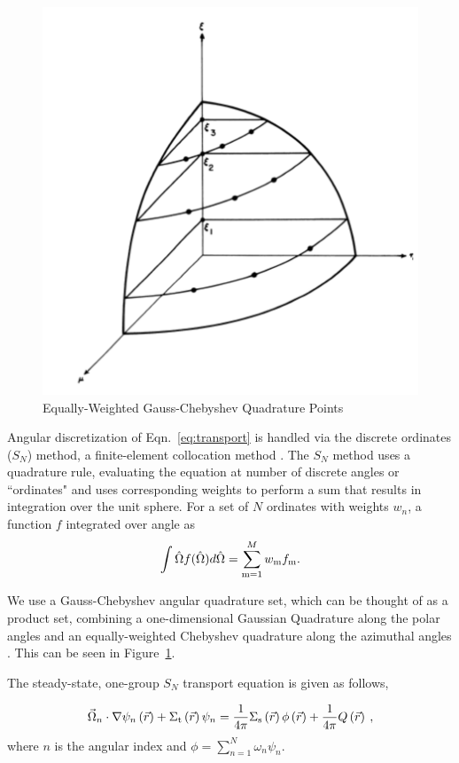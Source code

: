 \begin{figure}[H]
    \centering
    \includegraphics[width=.5\textwidth]{fig/SNPoints.png}
    \caption{Equally-Weighted Gauss-Chebyshev Quadrature Points \cite{Lathrop1965}}
    \label{fig:SN}
\end{figure}
%
Angular discretization of Eqn.~\eqref{eq:transport} is handled via the discrete ordinates ($S_N$) method, a finite-element collocation method \cite{Lathrop1965}. The $S_N$ method uses a quadrature rule, evaluating the equation at number of discrete angles or ``ordinates" and uses corresponding weights to perform a sum that results in integration over the unit sphere. 
For a set of $N$ ordinates with weights $w_n$, a function $f$ integrated over angle as
%
\begin{equation}

\int \hat{\Omega} f(\hat{\Omega}) d \hat{\Omega} = \sum\limits_{\mrm=1}^{M} w_\mrm f_\mrm.    

\end{equation}

We use a Gauss-Chebyshev angular quadrature set, which can be thought of as a product set, combining a one-dimensional Gaussian Quadrature along the polar angles and an equally-weighted Chebyshev quadrature along the azimuthal angles \cite{jarrel-thesis}. This can be seen in Figure~\ref{fig:SN}. 

The steady-state, one-group $S_N$ transport equation is given as follows,

 \begin{equation}
  \vec{\Omega}_n \cdot \nabla \psi_n \left(\vec{r}\right)+ \Sigma_{\mathrm{t}}\left(\vec{r}\right)\psi_n = \frac{1}{4 \pi} \Sigma_{\mathrm{s}}\left(\vec{r}\right) \phi\left(\vec{r}\right) + \frac{1}{4 \pi} Q\left(\vec{r}\right)\:,
  \label{eq:transport-angular}
 \end{equation}
where $n$ is the angular index and $\phi = \sum\limits_{n=1}^N \omega_n \psi_n$.


